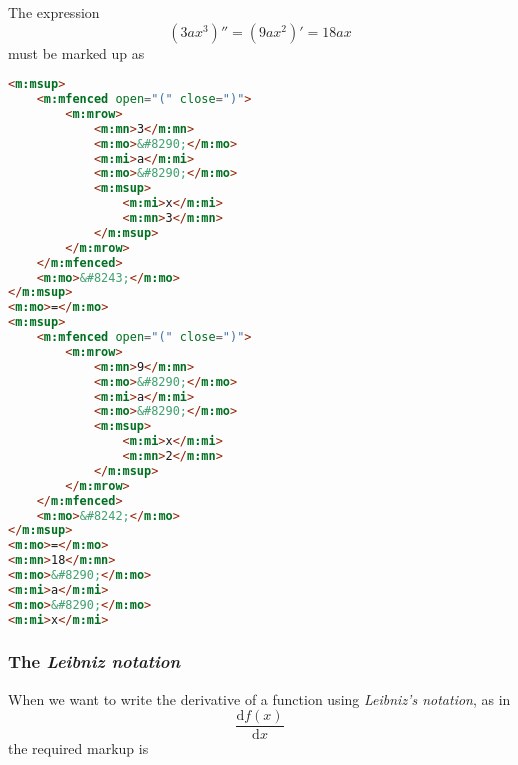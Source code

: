 \documentclass[english,a4paper,11pt]{article}
\begin{document}

\begin{eksempler}
The expression 
\begin{equation}
(3 a x^3)'' = (9 ax^2)' = 18 a x
\end{equation}
must be marked up as
\begin{lstlisting}[language=HTML]
<m:msup>
	<m:mfenced open="(" close=")">
		<m:mrow>
			<m:mn>3</m:mn>
			<m:mo>&#8290;</m:mo>
			<m:mi>a</m:mi>
			<m:mo>&#8290;</m:mo>
			<m:msup>
				<m:mi>x</m:mi>
				<m:mn>3</m:mn>
			</m:msup>
		</m:mrow>
	</m:mfenced>
	<m:mo>&#8243;</m:mo>
</m:msup>
<m:mo>=</m:mo>
<m:msup>
	<m:mfenced open="(" close=")">
		<m:mrow>
			<m:mn>9</m:mn>
			<m:mo>&#8290;</m:mo>
			<m:mi>a</m:mi>
			<m:mo>&#8290;</m:mo>
			<m:msup>
				<m:mi>x</m:mi>
				<m:mn>2</m:mn>
			</m:msup>
		</m:mrow>
	</m:mfenced>
	<m:mo>&#8242;</m:mo>
</m:msup>
<m:mo>=</m:mo>
<m:mn>18</m:mn>
<m:mo>&#8290;</m:mo>
<m:mi>a</m:mi>
<m:mo>&#8290;</m:mo>
<m:mi>x</m:mi>
\end{lstlisting}


\end{eksempler}

\subsubsection{The \emph{Leibniz notation}}
When we want to write the derivative of a function using \emph{Leibniz's notation}, as in
\begin{equation}
\frac{\text{d}f(x)}{\text{d}x}
\end{equation}
the required markup is
\end{document}
